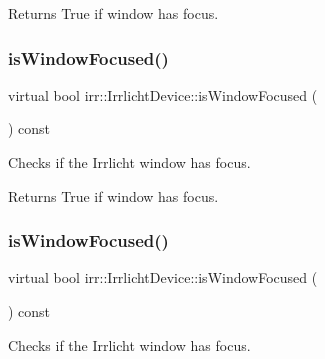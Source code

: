 \begin{DoxyReturn}{Returns}
True if window has focus. 
\end{DoxyReturn}
\mbox{\label{classirr_1_1IrrlichtDevice_a960069dc52b4f1303d18945dcbad7f3a}} 
\subsubsection{\texorpdfstring{is\+Window\+Focused()}{isWindowFocused()}\hspace{0.1cm}{\footnotesize\ttfamily [2/3]}}
{\footnotesize\ttfamily virtual bool irr\+::\+Irrlicht\+Device\+::is\+Window\+Focused (\begin{DoxyParamCaption}{ }\end{DoxyParamCaption}) const\hspace{0.3cm}{\ttfamily [pure virtual]}}



Checks if the Irrlicht window has focus. 

\begin{DoxyReturn}{Returns}
True if window has focus. 
\end{DoxyReturn}
\mbox{\label{classirr_1_1IrrlichtDevice_a960069dc52b4f1303d18945dcbad7f3a}} 
\subsubsection{\texorpdfstring{is\+Window\+Focused()}{isWindowFocused()}\hspace{0.1cm}{\footnotesize\ttfamily [3/3]}}
{\footnotesize\ttfamily virtual bool irr\+::\+Irrlicht\+Device\+::is\+Window\+Focused (\begin{DoxyParamCaption}{ }\end{DoxyParamCaption}) const\hspace{0.3cm}{\ttfamily [pure virtual]}}



Checks if the Irrlicht window has focus. 

